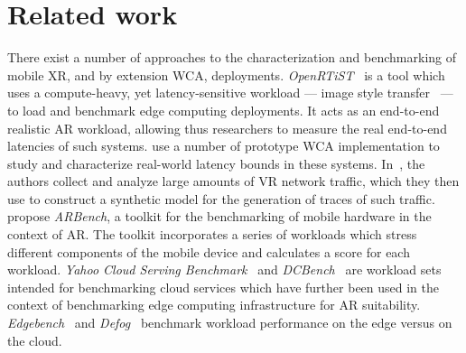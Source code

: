 \section{Related work}\label{sec:relwork}

There exist a number of approaches to the characterization and benchmarking of mobile \gls{XR}, and by extension \gls{WCA}, deployments.
\emph{OpenRTiST}~\cite{george2020openrtist} is a tool which uses a compute-heavy, yet latency-sensitive workload --- image style transfer~\cite{jing2019neural} --- to load and benchmark edge computing deployments.
It acts as an end-to-end realistic \gls{AR} workload, allowing thus researchers to measure the real end-to-end latencies of such systems.
\textcite{chen2017empirical} use a number of prototype \gls{WCA} implementation to study and characterize real-world latency bounds in these systems.
In~\cite{lecci2021open}, the authors collect and analyze large amounts of \gls{VR} network traffic, which they then use to construct a synthetic model for the generation of traces of such traffic.
\textcite{chetoui2022arbench} propose \emph{ARBench}, a toolkit for the benchmarking of mobile hardware in the context of \gls{AR}.
The toolkit incorporates a series of workloads which stress different components of the mobile device and calculates a score for each workload.
\emph{Yahoo Cloud Serving Benchmark}~\cite{cooper2010benchmarking} and \emph{DCBench}~\cite{jia2013characterizing} are workload sets intended for benchmarking cloud services which have further been used in the context of benchmarking edge computing infrastructure for \gls{AR} suitability.
\emph{Edgebench}~\cite{das2018edgebench} and \emph{Defog}~\cite{mcchesney2019defog} benchmark workload performance on the edge versus on the cloud.

